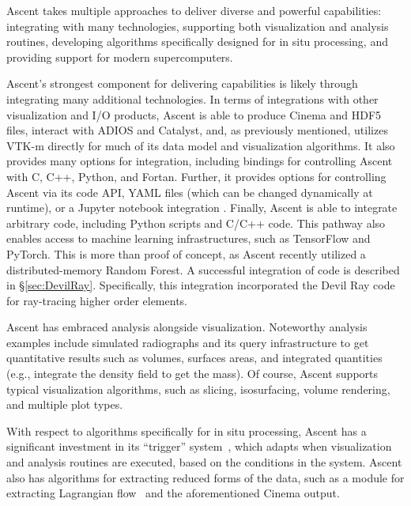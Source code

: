 \documentclass[graybox]{svmult}
\begin{document}
Ascent takes multiple approaches to deliver diverse and powerful capabilities:
integrating with many technologies,
supporting both visualization and analysis routines,
developing algorithms specifically designed for in situ processing,
and providing support for modern supercomputers.

Ascent's strongest component for delivering capabilities is likely
through integrating many additional technologies.
%
In terms of integrations with other visualization and I/O products,
Ascent is able to produce Cinema and HDF5 files, interact with
ADIOS and Catalyst, and, as previously mentioned, utilizes VTK-m
directly for much of its data model and visualization algorithms.
%
It also provides many options for integration, including
bindings
for controlling Ascent with  C, C++, Python, and Fortan.
%
Further, it provides options for controlling Ascent via its code API,
YAML files (which can be changed dynamically at runtime), or
a Jupyter notebook integration \cite{CyrusISAV}.
%
Finally, Ascent is able to integrate arbitrary code, including
Python scripts and C/C++ code.
%
This pathway also enables access to
machine learning infrastructures, such as TensorFlow and PyTorch.
%
This is more than proof of concept,
as Ascent recently utilized a distributed-memory Random Forest.
%
A successful integration of code is described in \S\ref{sec:DevilRay}.
%
Specifically, this integration incorporated the Devil Ray code for ray-tracing
higher order elements.

Ascent has embraced analysis alongside visualization.
%
Noteworthy analysis examples include simulated radiographs and its
query infrastructure to get quantitative results such as volumes,
surfaces areas, and integrated quantities (e.g., integrate the density field to get the mass).
%
Of course, Ascent supports typical visualization algorithms, such as
slicing, isosurfacing, volume rendering, and multiple plot types.

With respect to algorithms specifically for in situ processing, Ascent
has a significant investment in its ``trigger'' system~\cite{Larsen:ISAV18},
which adapts when visualization and analysis routines are executed,
based on the conditions in the system.
%
Ascent also has algorithms for extracting reduced forms of the data,
such as a module for extracting Lagrangian flow~\cite{Agranovsky:LDAV2014,Sane:EGPGV19} and the
aforementioned Cinema output.
\end{document}
